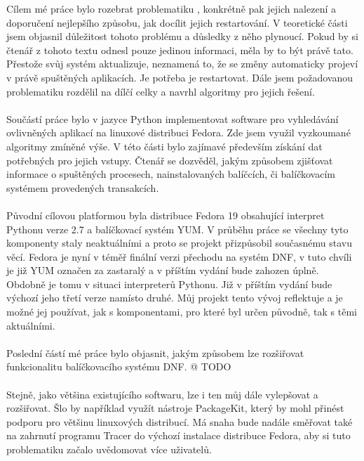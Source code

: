 \documentclass[
  field=inf,
  biblatex,
  glossaries,
  index
]{kidiplom}
\begin{document}
\begin{kiconclusions}
	Cílem mé práce bylo rozebrat problematiku , konkrétně pak jejich nalezení a doporučení nejlepšího způsobu, jak docílit jejich restartování. V teoretické části jsem objasnil důležitost tohoto problému a důsledky z něho plynoucí. Pokud by si čtenář z tohoto textu odnesl pouze jedinou informaci, měla by to být právě tato. Přestože svůj systém aktualizuje, neznamená to, že se změny automaticky projeví v právě spuštěných aplikacích. Je potřeba je restartovat. Dále jsem požadovanou problematiku rozdělil na dílčí celky a navrhl algoritmy pro jejich řešení.
	\\
	\\
	Součástí práce bylo v jazyce Python implementovat software pro vyhledávání ovlivněných aplikací na linuxové distribuci Fedora. Zde jsem využil vyzkoumané algoritmy zmíněné výše. V této části bylo zajímavé především získání dat potřebných pro jejich vstupy. Čtenář se dozvěděl, jakým způsobem zjišťovat informace o spuštěných procesech, nainstalovaných balíčcích, či balíčkovacím systémem provedených transakcích.
	\\
	\\
	Původní cílovou platformou byla distribuce Fedora 19 obsahující interpret Pythonu verze 2.7 a balíčkovací systém YUM. V průběhu práce se všechny tyto komponenty staly neaktuálními a proto se projekt přizpůsobil současnému stavu věcí. Fedora je nyní v téměř finální verzi přechodu na systém DNF, v tuto chvíli je již YUM označen za zastaralý a v příštím vydání bude zahozen úplně. Obdobně je tomu v situaci interpreterů Pythonu. Již v příštím vydání bude výchozí jeho třetí verze namísto druhé. Můj projekt tento vývoj reflektuje a je možné jej používat, jak s komponentami, pro které byl určen původně, tak s těmi aktuálními.
	\\
	\\
	Poslední částí mé práce bylo objasnit, jakým způsobem lze rozšiřovat funkcionalitu balíčkovacího systému DNF.
	@ TODO
	\\
	\\
	Stejně, jako většina existujícího softwaru, lze i ten můj dále vylepšovat a rozšiřovat. Šlo by například využít nástroje PackageKit, který by mohl přinést podporu pro většinu linuxových distribucí. Má snaha bude nadále směřovat také na zahrnutí programu Tracer do výchozí instalace distribuce Fedora, aby si tuto problematiku začalo uvědomovat více uživatelů.
\end{kiconclusions}
\end{document}
